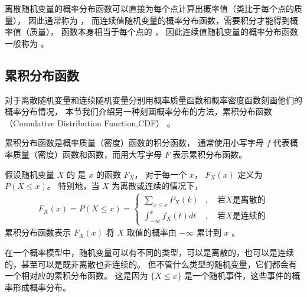\documentclass[letterpaper,10pt,english]{sphinxmanual}
\begin{document}
离散随机变量的概率分布函数可以直接为每个点计算出概率值（类比于每个点的质量），
因此通常称为 ，
而连续值随机变量的概率分布函数，需要积分才能得到概率值（质量），
函数本身相当于每个点的  ，
因此连续值随机变量的概率分布函数一般称为  。


\subsection{累积分布函数}
\label{\detokenize{_u6982_u7387_u57fa_u7840/content:id13}}
对于离散随机变量和连续随机变量分别用概率质量函数和概率密度函数刻画他们的概率分布情况，
本节我们介绍另一种刻画概率分布的方法，累积分布函数（Cumulative Distribution Function,CDF）
。

累积分布函数是概率质量（密度）函数的积分函数，
通常使用小写字母 \(f\) 代表概率质量（密度）函数和函数，而用大写字母 \(F\) 表示累积分布函数。

\begin{sphinxShadowBox}

假设随机变量 \(X\) 的  是 \(x\) 的函数 \(F_X\)，
对于每一个 \(x\)， \(F_X(x)\) 定义为 \(P(X \le x)\)。
特别地，当 \(X\) 为离散或连续的情况下，
\begin{equation}\label{equation:概率基础/content:概率基础/content:33}
\begin{split}F_X(x) = P(X \le x) = \left \{
\begin{aligned}
\sum_{x \le x} P_X(k) &, \quad \text{若} X \text{是离散的} \\
\int_{-\infty}^{x} f_X(t) dt &, \quad \text{若} X \text{是连续的}
\end{aligned}
\right.\end{split}
\end{equation}
累积分布函数表示 \(F_X(x)\) 将 \(X\) 取值的概率由 \(-\infty\) 累计到 \(x\) 。
\end{sphinxShadowBox}

在一个概率模型中，随机变量可以有不同的类型，可以是离散的，也可以是连续的，甚至可以是既非离散也非连续的。
但不管什么类型的随机变量，它们都会有一个相对应的累积分布函数。
这是因为 \(\{X \le x\}\) 是一个随机事件，这些事件的概率形成概率分布。
\end{document}
